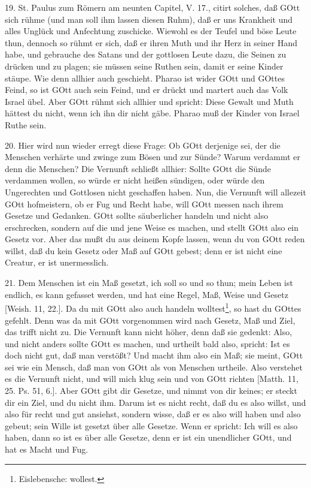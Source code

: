 19. St. Paulus zum Römern am neunten Capitel, V. 17., citirt solches, daß GOtt sich rühme (und man soll ihm lassen diesen Ruhm), daß er uns Krankheit und alles Unglück und Anfechtung zuschicke. Wiewohl es der Teufel und böse Leute thun, dennoch so rühmt er sich, daß er ihren Muth und ihr Herz in seiner Hand habe, und gebrauche des Satans und der gottlosen Leute dazu, die Seinen zu drücken und zu plagen; sie müssen seine Ruthen sein, damit er seine Kinder stäupe. Wie denn allhier auch geschieht. Pharao ist wider GOtt und GOttes Feind, so ist GOtt auch sein Feind, und er drückt und martert auch das Volk Israel übel. Aber GOtt rühmt sich allhier und spricht: Diese Gewalt und Muth hättest du nicht, wenn ich ihn dir nicht gäbe. Pharao muß der Kinder von Israel Ruthe sein.

20. Hier wird nun wieder erregt diese Frage: Ob GOtt derjenige sei, der die Menschen verhärte und zwinge zum Bösen und zur Sünde? Warum verdammt er denn die Menschen? Die Vernunft schließt allhier: Sollte GOtt die Sünde verdammen wollen, so würde er nicht heißen sündigen, oder würde den Ungerechten und Gottlosen nicht geschaffen haben. Nun, die Vernunft will allezeit GOtt hofmeistern, ob er Fug und Recht habe, will GOtt messen nach ihrem Gesetze und Gedanken. GOtt sollte säuberlicher handeln und nicht also erschrecken, sondern auf die und jene Weise es machen, und stellt GOtt also ein Gesetz vor. Aber das mußt du aus deinem Kopfe lassen, wenn du von GOtt reden willst, daß du kein Gesetz oder Maß auf GOtt gebest; denn er ist nicht eine Creatur, er ist unermesslich.

21. Dem Menschen ist ein Maß gesetzt, ich soll so und so thun; mein Leben ist endlich, es kann gefasset werden, und hat eine Regel, Maß, Weise und Gesetz [Weish. 11, 22.]. Da du mit GOtt also auch handeln wolltest\footnote{Eislebensche: wollest.}, so hast du GOttes gefehlt. Denn was da mit GOtt vorgenommen wird nach Gesetz, Maß und Ziel, das trifft nicht zu. Die Vernunft kann nicht höher, denn daß sie gedenkt: Also, und nicht anders sollte GOtt es machen, und urtheilt bald also,
spricht: Ist es doch nicht gut, daß man verstößt? Und macht ihm also ein Maß; sie meint, GOtt sei wie ein Mensch, daß man von GOtt als von Menschen urtheile. Also verstehet es die Vernunft nicht, und will mich klug sein und von GOtt richten [Matth. 11, 25. Ps. 51, 6.]. Aber GOtt gibt dir Gesetze, und nimmt von dir keines; er steckt dir ein Ziel, und du nicht ihm. Darum ist es nicht recht, daß du es also willst, und also für recht und gut ansiehst, sondern wisse, daß er es also will haben und also gebeut; sein Wille ist gesetzt über alle Gesetze. Wenn er spricht: Ich will es also haben, dann so ist es über alle Gesetze, denn er ist ein unendlicher GOtt, und hat es Macht und Fug.

